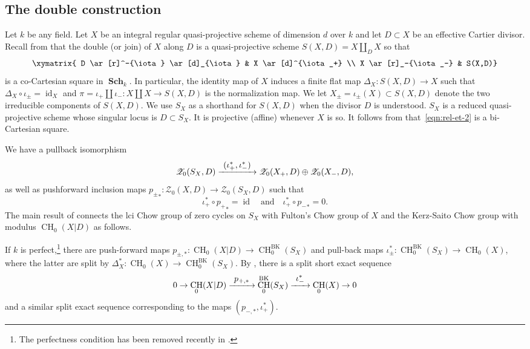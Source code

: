 \documentclass[JEP,XML,SOM,Unicode,published]{cedram}
\let\mathcal\mathscr
\def\To#1{\mathchoice{\xrightarrow{\textstyle\kern4pt#1\kern3pt}}{\stackrel{#1}{\longrightarrow}}{}{}}
\newcommand{\quand}{\quad\text{and}\quad}
\newcommand{\BK}{\mathrm{BK}}
\theoremstyle{definition}
\newcommand{\sZ}{{\mathcal Z}}
\DeclareMathOperator{\CH}{CH}
\DeclareMathOperator{\id}{id}
\DeclareMathOperator{\Sch}{\mathbf{Sch}}
\begin{document}
\subsection{The double construction}\label{sec:double-construction}
Let $k$ be any field.
Let $X$ be an integral regular quasi-projective scheme of dimension $d$ over $k$
and let $D \subset X$ be an effective Cartier divisor. Recall from
\cite[\S2.1]{BK} that the double (or join) of $X$ along $D$ is a quasi-projective
scheme $S(X,D) = X \amalg_D X$ so that
\begin{equation}\label{eqn:rel-et-2}
\begin{array}{c}
\xymatrix{
D \ar[r]^-{\iota} \ar[d]_{\iota} & X \ar[d]^{\iota_+} \\
X \ar[r]_-{\iota_-} & S(X,D)}
\end{array}
\end{equation}
is a co-Cartesian square in $\Sch_k$.
In particular, the identity map of $X$ induces a finite flat map
$\Delta_X\colon S(X,D) \to X$ such that $\Delta_X \circ \iota_\pm = \id_X$
and $\pi = \iota_+ \amalg \iota_-: X \amalg X \to S(X,D)$
is the normalization map.
We let $X_\pm = \iota_\pm(X) \subset S(X,D)$ denote the two irreducible
components of $S(X,D)$. We use $S_X$ as a shorthand for $S(X, D)$
when the divisor $D$ is understood. $S_X$ is a reduced quasi-projective
scheme whose singular locus is $D \subset S_X$.
It is projective (\resp affine) whenever
$X$ is so. It follows from \cite[Lem.\,2.2]{Krishna-2} that~\eqref{eqn:rel-et-2}
is a bi-Cartesian square.

We have a pullback isomorphism
\[
\sZ_0(S_X,D)\To{(\iota^*_{+}, \iota^*_{-})} \sZ_0(X_+,D) \oplus
\sZ_0(X_-,D),
\]
as well as pushforward inclusion maps
${p_{\pm}}_* \colon \sZ_0(X,D) \to \sZ_0(S_X,D)$ such that
\[
\iota^*_{+} \circ {p_{+}}_* = \id
\quand\iota^*_{+} \circ {p_{-}}_* = 0.
\]
The main result of \cite{BK} connects the lci Chow group of zero cycles on $S_X$ with Fulton's Chow group of $X$ and the Kerz-Saito Chow group with modulus $\CH_0(X|D)$ as follows.

If $k$ is perfect,\footnote{The perfectness condition has been removed
recently in \cite[Th.\,1.1]{GKR}.} there are push-forward maps
$p_{\pm,*} \colon \CH_0(X|D) \to \CH_0^{\BK}(S_X)$ and pull-back maps
$\iota^*_\pm \colon \CH_0^{\BK}(S_X) \to \CH_0(X)$, where the latter
are split by $\Delta^*_X\colon \CH_0(X) \to \CH_0^{\BK}(S_X)$.
By \cite[Th.\,7.1]{BK}, there is a split short exact
sequence
\begin{equation}\label{eqn:doubl-ex-seq}
0 \to \CH_0(X|D) \To{p_{+,*}} \CH_0^{\BK}(S_X) \To{\iota^*_-}
\CH_0(X) \to 0
\end{equation}
and a similar split exact sequence corresponding to the maps $(p_{-,*}, \iota^*_+)$.
\end{document}
